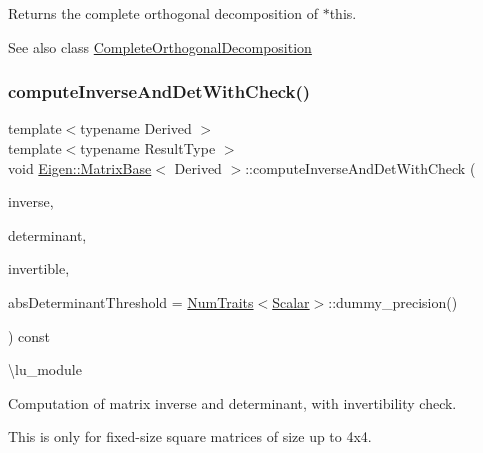 \begin{DoxyReturn}{Returns}
the complete orthogonal decomposition of {\ttfamily $\ast$this}.
\end{DoxyReturn}
\begin{DoxySeeAlso}{See also}
class \mbox{\hyperlink{class_eigen_1_1_complete_orthogonal_decomposition}{Complete\+Orthogonal\+Decomposition}} 
\end{DoxySeeAlso}
\mbox{\label{class_eigen_1_1_matrix_base_a7baaf2fdec0191a2166cf9fd84a2dcb2}} 
\subsubsection{\texorpdfstring{computeInverseAndDetWithCheck()}{computeInverseAndDetWithCheck()}}
{\footnotesize\ttfamily template$<$typename Derived $>$ \\
template$<$typename Result\+Type $>$ \\
void \mbox{\hyperlink{class_eigen_1_1_matrix_base}{Eigen\+::\+Matrix\+Base}}$<$ Derived $>$\+::compute\+Inverse\+And\+Det\+With\+Check (\begin{DoxyParamCaption}\item[{Result\+Type \&}]{inverse,  }\item[{typename Result\+Type\+::\+Scalar \&}]{determinant,  }\item[{bool \&}]{invertible,  }\item[{const Real\+Scalar \&}]{abs\+Determinant\+Threshold = {\ttfamily \mbox{\hyperlink{struct_eigen_1_1_num_traits}{Num\+Traits}}$<$\mbox{\hyperlink{class_eigen_1_1_dense_base_a5feed465b3a8e60c47e73ecce83e39a2}{Scalar}}$>$\+:\+:dummy\+\_\+precision()} }\end{DoxyParamCaption}) const\hspace{0.3cm}{\ttfamily [inline]}}

\textbackslash{}lu\+\_\+module

Computation of matrix inverse and determinant, with invertibility check.

This is only for fixed-\/size square matrices of size up to 4x4.


